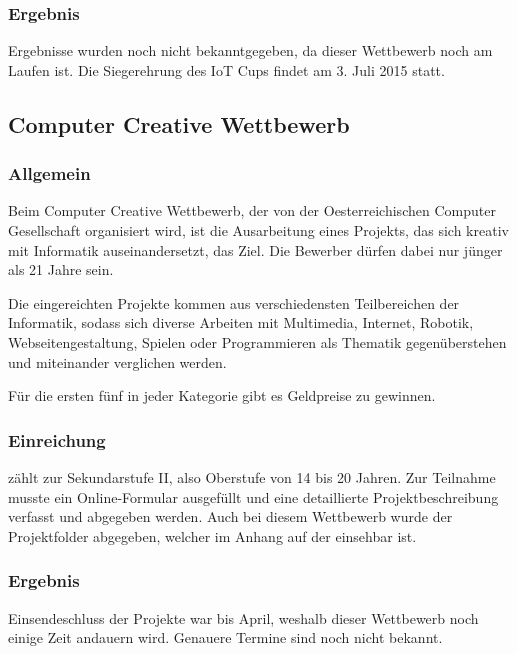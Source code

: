 \subsubsection{Ergebnis}
Ergebnisse wurden noch nicht bekanntgegeben, da dieser Wettbewerb noch am Laufen ist.
Die Siegerehrung des IoT Cups findet am 3. Juli 2015 statt.

\subsection{Computer Creative Wettbewerb}
\subsubsection{Allgemein}
Beim Computer Creative Wettbewerb, der von der Oesterreichischen Computer Gesellschaft
organisiert wird, ist die Ausarbeitung eines Projekts, das sich kreativ mit Informatik
auseinandersetzt, das Ziel. Die Bewerber dürfen dabei nur jünger als 21 Jahre sein.

Die eingereichten Projekte kommen aus verschiedensten Teilbereichen der Informatik,
sodass sich diverse Arbeiten mit Multimedia, Internet, Robotik, Webseitengestaltung, Spielen oder
Programmieren als Thematik gegenüberstehen und miteinander verglichen werden.

Für die ersten fünf in jeder Kategorie gibt es Geldpreise zu gewinnen.

\subsubsection{Einreichung}
\sblit zählt zur Sekundarstufe II, also Oberstufe von 14 bis 20 Jahren. Zur Teilnahme
musste ein Online-Formular ausgefüllt und eine detaillierte Projektbeschreibung
verfasst und abgegeben werden. Auch bei diesem Wettbewerb wurde der Projektfolder
abgegeben, welcher im Anhang auf der  einsehbar ist.

\subsubsection{Ergebnis}
Einsendeschluss der Projekte war bis April, weshalb dieser Wettbewerb noch einige Zeit
andauern wird. Genauere Termine sind noch nicht bekannt.
